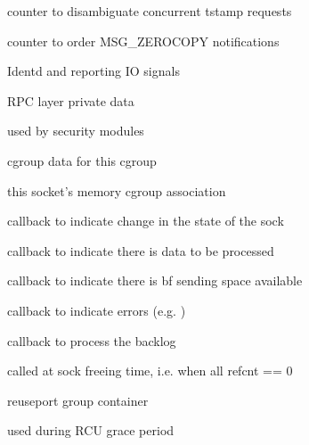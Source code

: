 \documentclass[a4paper,8pt,english]{sphinxmanual}
\begin{document}
\begin{description}
\item[{}] \leavevmode
counter to disambiguate concurrent tstamp requests

\item[{}] \leavevmode
counter to order MSG\_ZEROCOPY notifications

\item[{}] \leavevmode
Identd and reporting IO signals

\item[{}] \leavevmode
RPC layer private data

\item[{}] \leavevmode
used by security modules

\item[{}] \leavevmode
cgroup data for this cgroup

\item[{}] \leavevmode
this socket's memory cgroup association

\item[{}] \leavevmode
callback to indicate change in the state of the sock

\item[{}] \leavevmode
callback to indicate there is data to be processed

\item[{}] \leavevmode
callback to indicate there is bf sending space available

\item[{}] \leavevmode
callback to indicate errors (e.g. )

\item[{}] \leavevmode
callback to process the backlog

\item[{}] \leavevmode
called at sock freeing time, i.e. when all refcnt == 0

\item[{}] \leavevmode
reuseport group container

\item[{}] \leavevmode
used during RCU grace period

\end{description}
\end{document}
